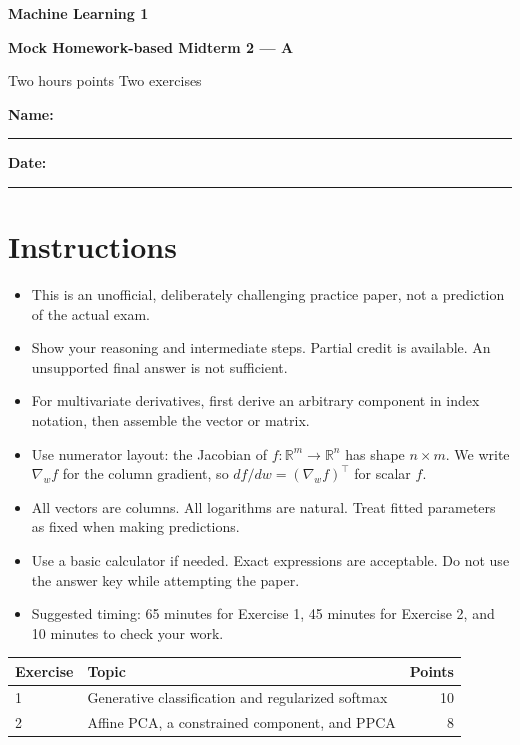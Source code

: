 \documentclass[11pt,a4paper]{article}
\newcommand{\R}{\mathbb R}
\begin{document}
\begin{center}
  {\Huge\bfseries\color{examblue}Machine Learning 1}\par
  \vspace{0.4em}
  {\LARGE\bfseries Mock Homework-based Midterm 2 --- A}\par
  \vspace{1em}
  {\large Two hours  points \qquad Two exercises}
\end{center}
\vspace{1em}
\textbf{Name:} \rule{8cm}{0.4pt}\hfill\textbf{Date:} \rule{3cm}{0.4pt}

\section*{Instructions}
\begin{itemize}
  \item This is an unofficial, deliberately challenging practice paper, not a prediction of the actual exam.
  \item Show your reasoning and intermediate steps. Partial credit is available. An unsupported final answer is not sufficient.
  \item For multivariate derivatives, first derive an arbitrary component in index notation, then assemble the vector or matrix.
  \item Use numerator layout: the Jacobian of $f:\R^m\to\R^n$ has shape $n\times m$. We write $\nabla_w f$ for the column gradient, so $df/dw=(\nabla_w f)^\top$ for scalar $f$.
  \item All vectors are columns. All logarithms are natural. Treat fitted parameters as fixed when making predictions.
  \item Use a basic calculator if needed. Exact expressions are acceptable. Do not use the answer key while attempting the paper.
  \item Suggested timing: 65 minutes for Exercise 1, 45 minutes for Exercise 2, and 10 minutes to check your work.
\end{itemize}

\begin{center}
\begin{tabular}{llr}
\toprule
Exercise & Topic & Points\\
\midrule
1 & Generative classification and regularized softmax & 10\\
2 & Affine PCA, a constrained component, and PPCA & 8\\
\bottomrule
\end{tabular}
\end{center}
\end{document}
